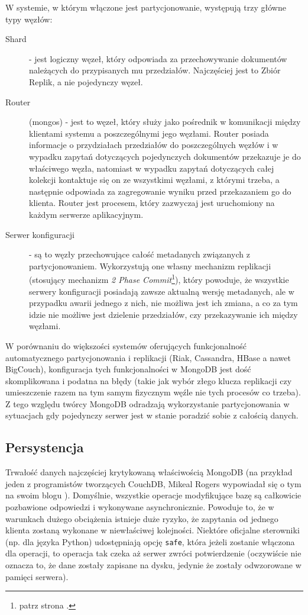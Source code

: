 W systemie, w którym włączone jest partycjonowanie, występują trzy główne typy węzłów:

\begin{description}
 \item[Shard] - jest logiczny węzeł, który odpowiada za przechowywanie dokumentów należących do przypisanych mu przedziałów.
 Najczęściej jest to Zbiór Replik, a nie pojedynczy węzeł.
 \item[Router] (mongos) - jest to węzeł, który służy jako pośrednik w komunikacji między klientami systemu a poszczególnymi jego węzłami.
 Router posiada informacje o przydziałach przedziałów do poszczególnych węzłów i w wypadku zapytań dotyczących pojedynczych dokumentów przekazuje je do właściwego węzła, natomiast w wypadku zapytań dotyczących całej kolekcji kontaktuje się on ze wszystkimi węzłami, z którymi trzeba, a następnie odpowiada za zagregowanie wyniku przed przekazaniem go do klienta.
 Router jest procesem, który zazwyczaj jest uruchomiony na każdym serwerze aplikacyjnym.
 \item[Serwer konfiguracji] - są to węzły przechowujące całość metadanych związanych z partycjonowaniem.
 Wykorzystują one własny mechanizm replikacji (stosujący mechanizm \emph{2 Phase Commit}\footnote{patrz strona \pageref{sec:2-phase-commit}.}), który powoduje, że wszystkie serwery konfiguracji posiadają zawsze aktualną wersję metadanych, ale w przypadku awarii jednego z nich, nie możliwa jest ich zmiana, a co za tym idzie nie możliwe jest dzielenie przedziałów, czy przekazywanie ich między węzłami.
\end{description}

W porównaniu do większości systemów oferujących funkcjonalność automatycznego partycjonowania i replikacji (Riak, Cassandra, HBase a nawet BigCouch), konfiguracja tych funkcjonalności w MongoDB jest dość skomplikowana i podatna na błędy (takie jak wybór złego klucza replikacji czy umieszczenie razem na tym samym fizycznym węźle nie tych procesów co trzeba).
Z tego względu twórcy MongoDB odradzają wykorzystanie partycjonowania w sytuacjach gdy pojedynczy serwer jest w stanie poradzić sobie z całością danych.

\subsection*{Persystencja}

Trwałość danych najczęściej krytykowaną właściwością MongoDB (na przykład jeden z programistów tworzących CouchDB, Mikeal Rogers wypowiadał się o tym na swoim blogu \cite{mongodb-durability}).
Domyślnie, wszystkie operacje modyfikujące bazę są całkowicie pozbawione odpowiedzi i wykonywane asynchronicznie.
Powoduje to, że w warunkach dużego obciążenia istnieje duże ryzyko, że zapytania od jednego klienta zostaną wykonane w niewłaściwej kolejności.
Niektóre oficjalne sterowniki (np. dla języka Python) udostępniają opcję \verb+safe+, która jeżeli zostanie włączona dla operacji, to operacja tak czeka aż serwer zwróci potwierdzenie (oczywiście nie oznacza to, że dane zostały zapisane na dysku, jedynie że zostały odwzorowane w pamięci serwera).

